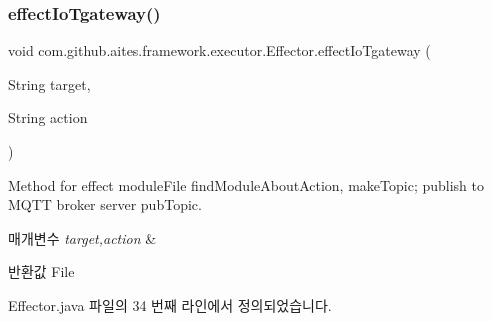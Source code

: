 \subsubsection{\texorpdfstring{effect\+Io\+Tgateway()}{effectIoTgateway()}}
{\footnotesize\ttfamily void com.\+github.\+aites.\+framework.\+executor.\+Effector.\+effect\+Io\+Tgateway (\begin{DoxyParamCaption}\item[{String}]{target,  }\item[{String}]{action }\end{DoxyParamCaption})}



Method for effect module\+File find\+Module\+About\+Action, make\+Topic; publish to M\+Q\+TT broker server pub\+Topic. 


\begin{DoxyParams}{매개변수}
{\em target,action} & \\
\hline
\end{DoxyParams}
\begin{DoxyReturn}{반환값}
File 
\end{DoxyReturn}


Effector.\+java 파일의 34 번째 라인에서 정의되었습니다.


